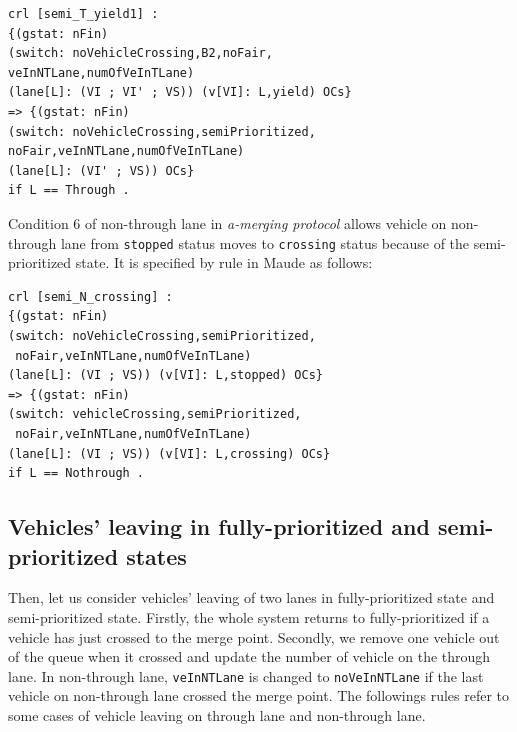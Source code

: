\documentclass[10pt, conference, compsocconf]{IEEEtran}
\begin{document}
\begin{footnotesize}
\begin{verbatim}
crl [semi_T_yield1] : 
{(gstat: nFin) 
(switch: noVehicleCrossing,B2,noFair,
veInNTLane,numOfVeInTLane) 
(lane[L]: (VI ; VI' ; VS)) (v[VI]: L,yield) OCs} 
=> {(gstat: nFin) 
(switch: noVehicleCrossing,semiPrioritized,
noFair,veInNTLane,numOfVeInTLane) 
(lane[L]: (VI' ; VS)) OCs} 
if L == Through .
\end{verbatim}
\end{footnotesize}

\noindent Condition 6 of non-through lane in \textit{a-merging protocol} allows vehicle on non-through lane from \verb!stopped! status moves to \verb!crossing! status because of the semi-prioritized state. 
It is specified by rule in Maude as follows:

\begin{footnotesize}
\begin{verbatim}
crl [semi_N_crossing] : 
{(gstat: nFin) 
(switch: noVehicleCrossing,semiPrioritized,
 noFair,veInNTLane,numOfVeInTLane) 
(lane[L]: (VI ; VS)) (v[VI]: L,stopped) OCs} 
=> {(gstat: nFin) 
(switch: vehicleCrossing,semiPrioritized,
 noFair,veInNTLane,numOfVeInTLane) 
(lane[L]: (VI ; VS)) (v[VI]: L,crossing) OCs}
if L == Nothrough .
\end{verbatim}
\end{footnotesize}

\subsection{Vehicles' leaving in fully-prioritized and semi-prioritized states}

Then, let us consider vehicles' leaving of two lanes in fully-prioritized state and semi-prioritized state. 
Firstly, the whole system returns to fully-prioritized if a vehicle has just crossed to the merge point.
Secondly, we remove one vehicle out of the queue when it crossed and update the number of vehicle on the through lane.
In non-through lane, \verb!veInNTLane! is changed to \verb!noVeInNTLane! if the last vehicle on non-through lane crossed the merge point.
The followings rules refer to some cases of vehicle leaving on through lane and non-through lane.
\end{document}
